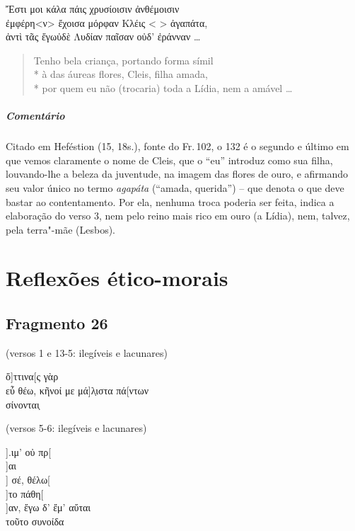 \begin{gkverse}
Ἔστι μοι κάλα πάις χρυσίοισιν ἀνθέμοισιν\\
ἐμφέρη<ν> ἔχοισα μόρφαν Κλέις <  > ἀγαπάτα,\\
ἀντὶ τᾶς ἔγωὐδὲ Λυδίαν παῖσαν οὐδ’ ἐράνναν \ldots{}
\end{gkverse}

\begin{verse}
Tenho bela criança, portando forma símil\\*
à das áureas flores, Cleis, filha amada,\\*
por quem eu não (trocaria) toda a Lídia, nem a amável \ldots{}
\end{verse}

{\paragraph{Comentário} Citado em Heféstion (15, 18s.), fonte do Fr.\,102, o 132 é o segundo e último em que vemos claramente o nome de Cleis, que o “eu” introduz como sua filha, louvando-lhe a
beleza da juventude, na imagem das flores de ouro, e afirmando seu valor único no termo \textit{agapáta} (``amada, querida'') -- que denota o que deve bastar ao contentamento. Por ela, nenhuma troca poderia ser feita, indica a elaboração do verso 3, nem pelo reino mais rico em ouro (a Lídia), nem, talvez, pela terra"-mãe (Lesbos).}



\chapter{Reflexões ético-morais}

\section{Fragmento 26} 

\begin{gkverse}
\textnormal{(versos 1 e 13-5: ilegíveis e lacunares)}

ὄ]ττινα[ς γὰρ\\
εὖ θέω, κῆνοί με μά]λ̣ιστα πά[ντων\\
σίνονται̣

\textnormal{(versos 5-6: ilegíveis e lacunares)}

           ].ιμ’ οὐ πρ[\\
  ]αι\\
  ] σέ, θέλω[\\
  ]το πάθη[\\
         ]αν, ἔγω δ’ ἔμ’ αὔται\\
τοῦτο συνοίδα
\end{gkverse}

